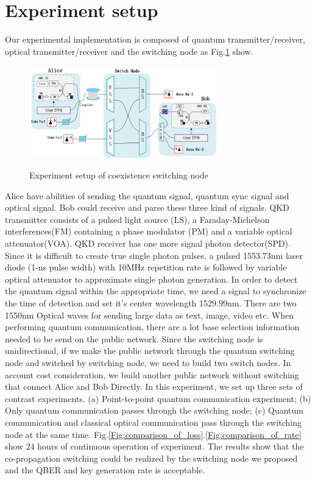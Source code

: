 \documentclass[letterpaper,10pt]{article}
\begin{document}
\section{Experiment setup}
Our experimental implementation is composed of quantum transmitter/receiver, optical transmitter/receiver and the switching node as Fig.\ref{Fig:experiment_of_switching_node} show.
\begin{figure}
 \centering
 \includegraphics[height= 4cm,width=.6\linewidth]{experiment_of_switching_node}
 \label{Fig:experiment_of_switching_node}
 \caption{Experiment setup of coexistence switching node}
\end{figure}
Alice have abilities of sending the quantum signal, quantum sync signal and optical signal. Bob could receive and parse these three kind of signals. QKD transmitter consists of a pulsed light source (LS), a Faraday-Michelson interferences(FM) containing a phase modulator (PM) and a variable optical attenuator(VOA). QKD receiver has one more signal photon detector(SPD). Since it is difficult to create true single photon pulses, a pulsed 1553.73nm laser diode (1-ns pulse width) with 10MHz repetition rate is followed by variable optical attenuator to approximate single photon generation. In order to detect the quantum signal within the appropriate time, we need a signal to synchronize the time of detection and set it's center wavelength 1529.99nm. There are two 1550nm Optical waves for sending large data as text, image, video etc. When performing quantum communication, there are a lot base selection information needed to be send on the public network. Since the switching node is unidirectional, if we make the public network through the quantum switching node and switched by switching node, we need to build two switch nodes. In account cost consideration, we build another public network without switching  that connect Alice and Bob Directly. In this experiment, we set up three sets of contrast experiments. (a) Point-to-point quantum communication experiment; (b) Only quantum communication passes through the switching node; (c) Quantum communication and classical optical communication pass through the switching node at the same time. Fig.\ref{Fig:comparison_of_loss}.\ref{Fig:comparison_of_rate} show 24 hours of continuous operation of experiment. The results show that the co-propagation switching could be realized by the switching node we proposed and the QBER and key generation rate is acceptable. 
\end{document}
